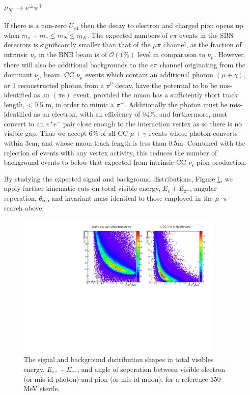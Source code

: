 \documentclass[11pt, a4paper]{article}
\begin{document}
\subsubsection{$\nu_N \rightarrow e^\pm \pi^\mp$ }
If there is a non-zero $U_{e4}$ then the decay to electron and charged pion
opens up when $m_\pi +m_e \leq m_N \leq m_K$. The expected numbers of $e \pi$
events in the SBN detectors is significantly smaller than that of the $\mu \pi$
channel, as the fraction of intrinsic $\nu_e$ in the BNB beam is of
$\mathcal{O}(1\%)$ level in comparason to $\nu_\mu$. However, there will also be additional backgrounds to the
$e \pi$ channel originating from the dominant $\nu_\mu$ beam. CC $\nu_\mu$ events which contain an additional photon $(\mu+\gamma)$, or 1 reconstructed photon from a $\pi^0$ decay, have the potential to be be mis-identified as an $(\pi
e)$ event, provided the muon has a sufficiently short track length, < 0.5 m, in order to mimic a $\pi^-$. Additionally the photon must be mis-identified as an electron, with an efficiency of 94\%, and furthermore, must convert to an $e^+e^-$ pair close enough to the interaction vertex as so there is no visible gap. Thus we accept 6\% of all CC $\mu+\gamma$ events whose photon converts within 3cm, and whose muon track length is less than 0.5m. Combined with the rejection of events with any vertex activity, this reduces the number of background events to below that expected from intrinsic CC $\nu_e$ pion production.

By studying the expected signal and background distributions, Figure \ref{fig:e_pi_dist}, we apply further kinematic cuts on total visible energy, $E_{e} + E_{\pi^+}$, angular seperation, $\theta_\text{sep}$ and invariant mass identical to those employed in the $\mu^- \pi^+$ search above. 
\begin{figure}[h]
\center
\includegraphics[width=0.9\textwidth,clip,trim=0 0 0 0]{figures/e_pi_dist.pdf}
\caption{\label{fig:e_pi_dist} The signal and background distribution shapes in total visibles energy,  $E_{\pi^+}+E_{e^-}$, and angle of seperation between visible electron (or mis-id photon) and pion (or mis-id muon), for a reference 350 MeV sterile. }

\end{figure}
\end{document}
